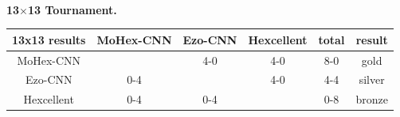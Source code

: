 \documentclass{icga}
\def\Eo{\mbox{\sc Ezo}}
\def\Ec{\mbox{\sc Ezo-CNN}}
\def\Hent{\mbox{\sc Hexcellent}}
\def\Mx{\mbox{\sc MoHex}}
\def\Mc{\mbox{\sc MoHex-CNN}}
\begin{document}

~

{\large\bf 13$\times$13 Tournament.}

\hfill\begin{tabular}{|c|c|c|c|c|c|}
\hline 13x13 results &\Mc{} &\Ec{}  &\Hent{} & total & result \\ 
\hline \Mc{}         &      &  4-0  & 4-0  & 8-0   & gold \\
\hline \Ec{}         &  0-4 &       & 4-0  & 4-4   & silver \\
\hline \Hent{}         &  0-4 &  0-4  &      & 0-8   & bronze \\
\hline
\end{tabular}\hfill~

%
%
%
%
%
%
%
%
%
%
%

\end{document}
